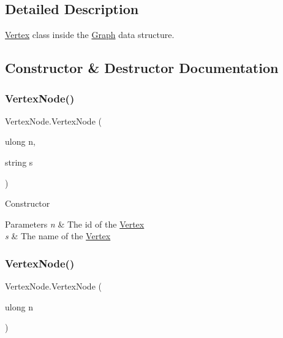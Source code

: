 \subsection{Detailed Description}
\hyperlink{structVertex}{Vertex} class inside the \hyperlink{classGraph}{Graph} data structure. 



\subsection{Constructor \& Destructor Documentation}
\mbox{\label{classVertexNode_a354784337cef2fb0d38803aa728940f3}} 
\subsubsection{\texorpdfstring{Vertex\+Node()}{VertexNode()}\hspace{0.1cm}{\footnotesize\ttfamily [1/5]}}
{\footnotesize\ttfamily Vertex\+Node.\+Vertex\+Node (\begin{DoxyParamCaption}\item[{ulong}]{n,  }\item[{string}]{s }\end{DoxyParamCaption})\hspace{0.3cm}{\ttfamily [inline]}}



Constructor 


\begin{DoxyParams}{Parameters}
{\em n} & The id of the \hyperlink{structVertex}{Vertex}\\
\hline
{\em s} & The name of the \hyperlink{structVertex}{Vertex}\\
\hline
\end{DoxyParams}
\mbox{\label{classVertexNode_a7704fbb6d0ce1ad606c2157461a3c737}} 
\subsubsection{\texorpdfstring{Vertex\+Node()}{VertexNode()}\hspace{0.1cm}{\footnotesize\ttfamily [2/5]}}
{\footnotesize\ttfamily Vertex\+Node.\+Vertex\+Node (\begin{DoxyParamCaption}\item[{ulong}]{n }\end{DoxyParamCaption})\hspace{0.3cm}{\ttfamily [inline]}}



